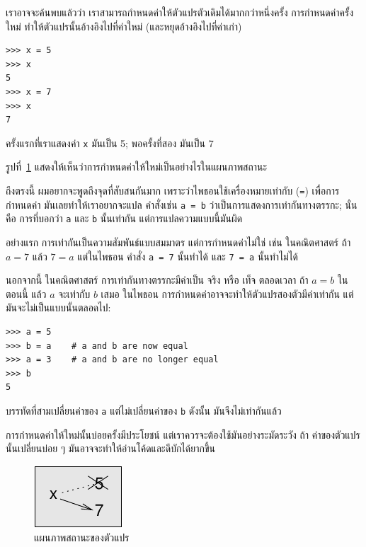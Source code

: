 เราอาจจะค้นพบแล้วว่า เราสามารถกำหนดค่าให้ตัวแปรตัวเดิมได้มากกว่าหนึ่งครั้ง การกำหนดค่าครั้งใหม่
ทำให้ตัวแปรนั้นอ้างอิงไปที่ค่าใหม่ (และหยุดอ้างอิงไปที่ค่าเก่า)

\begin{verbatim}
>>> x = 5
>>> x
5
>>> x = 7
>>> x
7
\end{verbatim}
%
ครั้งแรกที่เราแสดงค่า {\tt x} มันเป็น 5; พอครั้งที่สอง มันเป็น 7

รูปที่~\ref{fig.assign2} แสดงให้เห็นว่าการกำหนดค่าให้ใหม่เป็นอย่างไรในแผนภาพสถานะ 
 
 

ถึงตรงนี้ ผมอยากจะพูดถึงจุดที่สับสนกันมาก
เพราะว่าไพธอนใช้เครื่องหมายเท่ากับ ({\tt =}) เพื่อการกำหนดค่า มันเลยทำให้เราอยากจะแปล
คำสั่งเช่น {\tt a = b} ว่าเป็นการแสดงการเท่ากันทางตรรกะ; นั่นคือ การที่บอกว่า 
{\tt a} และ {\tt b} นั้นเท่ากัน  แต่การแปลความแบบนี้มันผิด

อย่างแรก การเท่ากันเป็นความสัมพันธ์แบบสมมาตร แต่การกำหนดค่าไม่ใช่ เช่น ในคณิตศาสตร์
ถ้า $a=7$ แล้ว $7=a$  แต่ในไพธอน คำสั่ง {\tt a = 7} นั้นทำได้ และ {\tt 7 = a} นั้นทำไม่ได้

นอกจากนี้ ในคณิตศาสตร์ การเท่ากันทางตรรกะมีค่าเป็น จริง หรือ เท็จ ตลอดเวลา ถ้า $a=b$ ในตอนนี้ 
แล้ว $a$ จะเท่ากับ $b$ เสมอ  ในไพธอน การกำหนดค่าอาจจะทำให้ตัวแปรสองตัวมีค่าเท่ากัน 
แต่มันจะไม่เป็นแบบนั้นตลอดไป:

\begin{verbatim}
>>> a = 5
>>> b = a    # a and b are now equal
>>> a = 3    # a and b are no longer equal
>>> b
5
\end{verbatim}
% 
บรรทัดที่สามเปลี่ยนค่าของ {\tt a} แต่ไม่เปลี่ยนค่าของ {\tt b} ดังนั้น มันจึงไม่เท่ากันแล้ว

การกำหนดค่าให้ใหม่นั้นบ่อยครั้งมีประโยชน์ แต่เราควรจะต้องใช้มันอย่างระมัดระวัง ถ้า
ค่าของตัวแปรนั้นเปลี่ยนบ่อย ๆ มันอาจจะทำให้อ่านโค้ดและดีบักได้ยากขึ้น

\begin{figure}
\centerline
{\includegraphics[scale=0.8]{figs/assign2.pdf}}
\caption{แผนภาพสถานะของตัวแปร}
\label{fig.assign2}
\end{figure}



